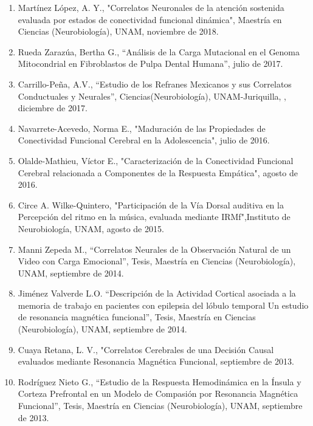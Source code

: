 \documentclass[11pt]{article}
\begin{document}
\begin{enumerate}
\item Martínez López, A. Y., "Correlatos Neuronales de la atención sostenida evaluada por estados de conectividad funcional dinámica", Maestría en Ciencias 
(Neurobiología), UNAM,   noviembre de 2018.

\item Rueda Zarazúa, Bertha G., “Análisis de la Carga Mutacional en el Genoma Mitocondrial en Fibroblastos de Pulpa Dental Humana”,   julio de 2017.

\item Carrillo-Peña, A.V., “Estudio de los Refranes Mexicanos y sus Correlatos Conductuales y Neurales”, Ciencias(Neurobiología), UNAM-Juriquilla, ,   
diciembre 
de 2017.

\item Navarrete-Acevedo, Norma E., "Maduración de las Propiedades de Conectividad Funcional Cerebral en la Adolescencia",   julio de 2016.

\item Olalde-Mathieu, Víctor E., "Caracterización de la Conectividad Funcional Cerebral relacionada a Componentes de la Respuesta Empática",   agosto de 
2016.

\item Circe A. Wilke-Quintero, "Participación de la Vía Dorsal auditiva en la Percepción del ritmo en la música, evaluada mediante IRMf",Instituto de 
Neurobiología, UNAM,   agosto de 2015.

\item Manni Zepeda M., “Correlatos Neurales de la Observación Natural de un Video con Carga Emocional”, Tesis, Maestría en Ciencias (Neurobiología), UNAM,   
septiembre de 2014.

\item Jiménez Valverde L.O. “Descripción de la Actividad Cortical asociada a la memoria de trabajo en pacientes con epilepsia del lóbulo temporal Un estudio 
de 
resonancia magnética funcional”, Tesis, Maestría en Ciencias (Neurobiología), UNAM,   septiembre de 2014.

\item Cuaya Retana, L. V., "Correlatos Cerebrales de una Decisión Causal evaluados mediante Resonancia Magnética Funcional,   septiembre de 2013.

\item Rodríguez Nieto G., “Estudio de la Respuesta Hemodinámica en la Ínsula y Corteza Prefrontal en un Modelo de Compasión por Resonancia Magnética 
Funcional”, 
Tesis, Maestría en Ciencias (Neurobiología), UNAM,   septiembre de 2013.


\end{enumerate}
\end{document}
